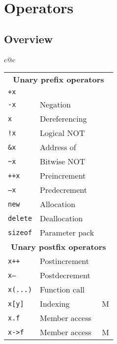 \section{Operators}

\subsection{Overview}
\begingroup
\newcommand{\overloadable}[2]{{\tt #1} & #2 & \Checkmark}
\newcommand{\overloadableM}[2]{{\tt #1} & #2 & M}
\newcommand{\notoverloadable}[2]{{\tt #1} & #2 & \XSolidBrush}

\begin{center}
  \begin{tabular}{c@{\hspace{1cm}}c}
    \begin{tabular}{llc}
      \rotatebox{45}{\textbf{Operator}} & \rotatebox{45}{\textbf{Description}} & \rotatebox{90}{\textbf{Overloadable}} \\
      \toprule
      \multicolumn{3}{c}{\bf\sc Unary prefix operators} \\
      \midrule
      \overloadable{+x}{} \\
      \overloadable{-x}{Negation} \\
      \overloadable{*x}{Dereferencing} \\
      \overloadable{!x}{Logical NOT} \\
      \overloadable{\&x}{Address of} \\
      \overloadable{\~{}x}{Bitwise NOT} \\
      \overloadable{++x}{Preincrement} \\
      \overloadable{--x}{Predecrement} \\
      \overloadable{new}{Allocation} \\
      \overloadable{delete}{Deallocation} \\
      \overloadable{sizeof}{Parameter pack} \\
      \midrule
      \multicolumn{3}{c}{\bf\sc Unary postfix operators} \\
      \midrule
      \overloadable{x++}{Postincrement} \\
      \overloadable{x--}{Postdecrement} \\
      \overloadable{x(...)}{Function call} \\
      \overloadableM{x[y]}{Indexing} \\
      \notoverloadable{x.f}{Member access} \\
      \overloadableM{x->f}{Member access} \\

\end{tabular}
\end{tabular}
\end{center}
